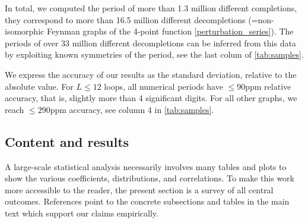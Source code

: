 \documentclass[11pt,a4paper]{article}
\renewcommand{\|}{\rule[-0.4ex]{0.2ex}{1.2em}}
\begin{document}
In total, we computed the period of more than 1.3 million different completions, they correspond to more than 16.5 million different decompletions (=non-isomorphic Feynman graphs of the 4-point function \cref{perturbation_series}). The periods of over 33 million different decompletions can be inferred from this data by exploiting known symmetries of the period, see the last colum of \cref{tab:samples}.


	
We express the accuracy of our results  as the standard deviation, relative to the absolute value. For $L \leq 12$ loops, all numerical periods have $\leq 90$ppm relative accuracy, that is, slightly more than 4 significant digits. For all other graphs, we reach $\leq 290$ppm accuracy, see column 4 in \cref{tab:samples}. 

\FloatBarrier
	
\subsection{Content and results}\label{sec:results}

A large-scale statistical analysis necessarily involves many tables and plots to show the various coefficients, distributions, and correlations. To make this work more accessible to the reader, the present section is a survey of all central outcomes. References point to the concrete subsections and tables in the main text which support our claims empirically. 
\bigskip
\end{document}
